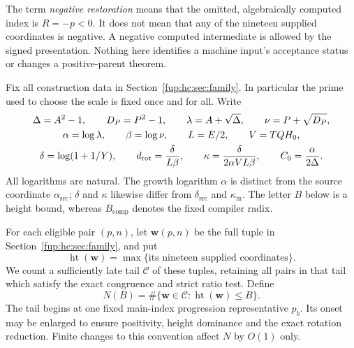 \documentclass[11pt,letterpaper]{article}
\theoremstyle{definition}\newtheorem{definition}[theorem]{Definition}
\theoremstyle{remark}\newtheorem{remark}[theorem]{Remark}
\newcommand{\asrc}{\alpha_{\mathrm{src}}}
\newcommand{\dsrc}{\delta_{\mathrm{src}}}
\newcommand{\kin}{\kappa_{\mathrm{in}}}
\newcommand{\drot}{d_{\mathrm{rot}}}
\newcommand{\htop}{\operatorname{ht}}
\begin{document}
The term \emph{negative restoration} means that the omitted, algebraically computed index is $R=-p<0$. It does not mean that any of the nineteen supplied coordinates is negative. A negative computed intermediate is allowed by the signed presentation. Nothing here identifies a machine input's acceptance status or changes a positive-parent theorem.

Fix all construction data in Section~\ref{fup:hc:sec:family}. In particular the prime used to choose the scale is fixed once and for all. Write
\begin{gather}\label{fup:hc:eq:constants}
 \Delta=A^2-1,\qquad D_P=P^2-1,\qquad
 \lambda=A+\sqrt\Delta,\qquad \nu=P+\sqrt{D_P},\\
 \alpha=\log\lambda,\qquad \beta=\log\nu,\qquad
 L=E/2,\qquad V=TQH_0,\notag\\
 \delta=\log(1+1/Y),\qquad
 \drot=\frac{\delta}{L\beta},\qquad
 \kappa=\frac{\delta}{2\alpha V L\beta},\qquad
 C_0=\frac{\alpha}{2\Delta}.\notag
\end{gather}
All logarithms are natural. The growth logarithm $\alpha$ is distinct from the source coordinate $\asrc$; $\delta$ and $\kappa$ likewise differ from $\dsrc$ and $\kin$. The letter $B$ below is a height bound, whereas $B_{\mathrm{comp}}$ denotes the fixed compiler radix.

For each eligible pair $(p,n)$, let $\mathbf w(p,n)$ be the full tuple in Section~\ref{fup:hc:sec:family}, and put
\[
 \htop(\mathbf w)=\max\{\text{its nineteen supplied coordinates}\}.
\]
We count a sufficiently late tail $\mathcal C$ of these tuples, retaining all pairs in that tail which satisfy the exact congruence and strict ratio test. Define
\[
 N(B)=\#\{\mathbf w\in\mathcal C:\htop(\mathbf w)\le B\}.
\]
The tail begins at one fixed main-index progression representative $p_b$. Its onset may be enlarged to ensure positivity, height dominance and the exact rotation reduction. Finite changes to this convention affect $N$ by $O(1)$ only.
\end{document}
